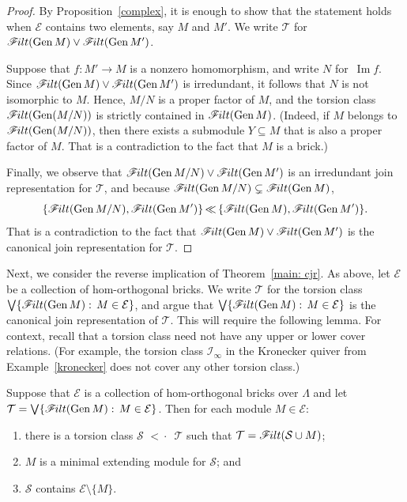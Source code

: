 \documentclass[ALCO,ThmDefs,Unicode,epreuves]{cedram}
\DeclareMathOperator{\image}{Im}
\newcommand{\calE}{\mathcal{E}}
\newcommand{\calI}{\mathcal{I}}
\newcommand{\calS}{\mathcal{S}}
\newcommand{\calT}{\mathcal{T}}
\newcommand{\filt}{\mathscr{F}\Mk ilt}
\newcommand{\covered}{{\,\,<\!\!\!\!\cdot\,\,\,}}
\newcommand{\join}{\vee}
\renewcommand{\Join}{\bigvee}
\newcommand{\strictrefines}{{\,{\ll}\,}}
\newcommand{\Gen}{\operatorname{Gen}}
\renewcommand{\1}{\hat{1}}
\newcommand{\0}{\hat{0}}
\newcommand*{\Mk}{\mkern -2mu}
\begin{document}
\begin{proof}
By Proposition~\ref{complex}, it is enough to show that the statement holds when $\calE$ contains two elements, say $M$ and $M'$.
We write $\calT$ for $\filt(\Gen M) \join \filt(\Gen M')$.

Suppose that $f:M'\to M$ is a nonzero homomorphism, and write $N$ for~$\image f$.
Since $\filt(\Gen M) \join \filt(\Gen M')$ is irredundant, it follows that $N$ is not isomorphic to $M$.
Hence, $M/N$ is a proper factor of $M$, and the torsion class $\filt(\Gen(M/N))$ is strictly contained in $\filt(\Gen M)$.
(Indeed, if $M$ belongs to $\filt(\Gen(M/N))$, then there exists a submodule $Y\subseteq M$ that is also a proper factor of $M$.
That is a contradiction to the fact that $M$ is a brick.)

Finally, we observe that $\filt(\Gen M/N) \join \filt(\Gen M')$ is an irredundant join representation for $\calT$, and because $\filt(\Gen M/N) \subsetneq \filt(\Gen M)$,
$$\{\filt(\Gen M/N), \filt(\Gen M')\} \strictrefines \{\filt(\Gen M), \filt(\Gen M')\}.$$ 
That is a contradiction to the fact that $\filt(\Gen M)\join \filt(\Gen M')$ is the canonical join representation for $\calT$.
\end{proof}

Next, we consider the reverse implication of Theorem~\ref{main: cjr}.
As above, let $\calE$ be a collection of hom-orthogonal bricks.
We write $\calT$ for the torsion class $\Join \{\filt(\Gen M):\, M\in
\calE\}$, and argue that $\Join \{\filt(\Gen M):\, M\in \calE\}$ is the
canonical join representation of $\calT$.
This will require the following lemma. 
For context, recall that a torsion class need not have any upper or lower cover relations.
(For example, the torsion class $\calI_\infty$ in the Kronecker quiver
from Example~\ref{kronecker} does not cover any other torsion class.)

\begin{lemma}\label{lem:join-has-lower-faces}
Suppose that $\calE$ is a collection of hom-orthogonal bricks over
$\Lambda$ and let $\calT = \Join \{\filt(\Gen M):\,M\in \calE\}$.
Then for each module $M\in \calE$:
\begin{enumerate}
\item there is a torsion class $\calS\covered \calT$ such that $\calT = \filt(\calS \cup M)$;
 \item $M$ is a minimal extending module for $\calS$; and
 \item $\calS$ contains $\calE \setminus \{M\}$.
 \end{enumerate}
\end{lemma}
\end{document}

